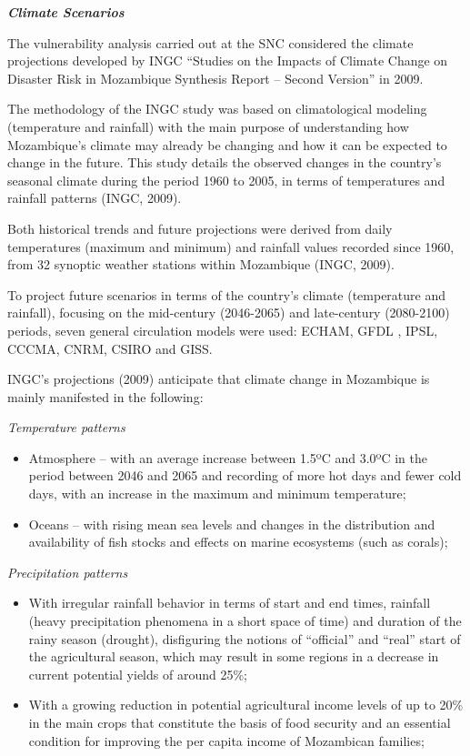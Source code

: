 \documentclass[
]{book}
\begin{document}
\textbf{\emph{Climate Scenarios}}

The vulnerability analysis carried out at the SNC considered the climate projections developed by INGC ``Studies on the Impacts of Climate Change on Disaster Risk in Mozambique Synthesis Report -- Second Version'' in 2009.

The methodology of the INGC study was based on climatological modeling (temperature and rainfall) with the main purpose of understanding how Mozambique's climate may already be changing and how it can be expected to change in the future. This study details the observed changes in the country's seasonal climate during the period 1960 to 2005, in terms of temperatures and rainfall patterns (INGC, 2009).

Both historical trends and future projections were derived from daily temperatures (maximum and minimum) and rainfall values recorded since 1960, from 32 synoptic weather stations within Mozambique (INGC, 2009).

To project future scenarios in terms of the country's climate (temperature and rainfall), focusing on the mid-century (2046-2065) and late-century (2080-2100) periods, seven general circulation models were used: ECHAM, GFDL , IPSL, CCCMA, CNRM, CSIRO and GISS.

INGC's projections (2009) anticipate that climate change in Mozambique is mainly manifested in the following:

\emph{Temperature patterns}

\begin{itemize}
\item
  Atmosphere -- with an average increase between 1.5ºC and 3.0ºC in the period between 2046 and 2065 and recording of more hot days and fewer cold days, with an increase in the maximum and minimum temperature;
\item
  Oceans -- with rising mean sea levels and changes in the distribution and availability of fish stocks and effects on marine ecosystems (such as corals);
\end{itemize}

\emph{Precipitation patterns}

\begin{itemize}
\item
  With irregular rainfall behavior in terms of start and end times, rainfall (heavy precipitation phenomena in a short space of time) and duration of the rainy season (drought), disfiguring the notions of ``official'' and ``real'' start of the agricultural season, which may result in some regions in a decrease in current potential yields of around 25\%;
\item
  With a growing reduction in potential agricultural income levels of up to 20\% in the main crops that constitute the basis of food security and an essential condition for improving the per capita income of Mozambican families;
\end{itemize}
\end{document}
